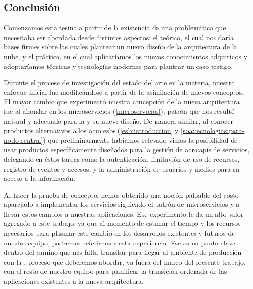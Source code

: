 \subsection{Conclusión}
\label{conclusion}

Comenzamos esta tesina a partir de la existencia de una problemática que necesitaba ser abordada desde distintos aspectos: el teórico, el cual nos daría bases firmes sobre las cuales plantear un nuevo diseño de la arquitectura de la nube, y el práctico, en el cual aplicaríamos los nuevos conocimientos adquiridos y adoptaríamos técnicas y tecnologías modernas para plantear un caso testigo.

Durante el proceso de investigación del estado del arte en la materia, nuestro enfoque inicial fue modificándose a partir de la asimilación de nuevos conceptos. El mayor cambio que experimentó nuestra concepción de la nueva arquitectura fue al ahondar en los microservicios (\autoref{microservicios}), patrón que nos resultó natural y adecuado para la {\cloud} y su nuevo diseño. De manera similar, al conocer productos alternativos a los \glspl{acro:esb} (\autoref{esb:introduccion} y \autoref{soa:tecnologias:para-nodo-central}) que preliminarmente habíamos relevado vimos la posibilidad de usar productos específicamente diseñados para la gestión de \glspl{acro:api} de servicios, delegando en éstos tareas como la autenticación, limitavión de uso de recursos, registro de eventos y accesos, y la administración de usuarios y medios para su acceso a la información.

Al hacer la prueba de concepto, hemos obtenido una noción palpable del costo aparejado a implementar los servicios siguiendo el patrón de microservicios y a llevar estos cambios a nuestras aplicaciones. Ese experimento le da un alto valor agregado a este trabajo, ya que al momento de estimar el tiempo y los recursos necesarios para plasmar este cambio en los desarrollos existentes y futuros de nuestro equipo, podremos referirnos a esta experiencia. Ese es un punto clave dentro del camino que nos falta transitar para llegar al ambiente de producción con la {\cloud}, proceso que deberemos abordar, ya fuera del marco del presente trabajo, con el resto de nuestro equipo para planificar la transición ordenada de las aplicaciones existentes a la nueva arquitectura.

